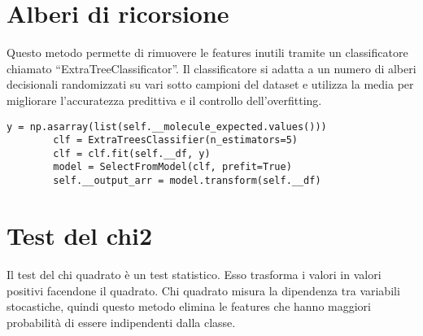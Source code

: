 \section{Alberi di ricorsione}\label{sec:alberi-di-ricorsione}
Questo metodo permette di rimuovere le features inutili tramite un classificatore chiamato ``ExtraTreeClassificator''.
Il classificatore si adatta a un numero di alberi decisionali randomizzati su vari sotto campioni del dataset e utilizza la media
per migliorare l'accuratezza predittiva e il controllo dell'overfitting.
\begin{lstlisting}[label={lst:tree}]
    y = np.asarray(list(self.__molecule_expected.values()))
        clf = ExtraTreesClassifier(n_estimators=5)
        clf = clf.fit(self.__df, y)
        model = SelectFromModel(clf, prefit=True)
        self.__output_arr = model.transform(self.__df)
\end{lstlisting}

\section{Test del chi2}\label{sec:test-del-chi2}
Il test del chi quadrato \`e un test statistico.
Esso trasforma i valori in valori positivi facendone il quadrato.
Chi quadrato misura la dipendenza tra variabili stocastiche, quindi questo metodo elimina le features
che hanno maggiori probabilit\`a di essere indipendenti dalla classe.
\begin{lstlisting}

\end{lstlisting}


